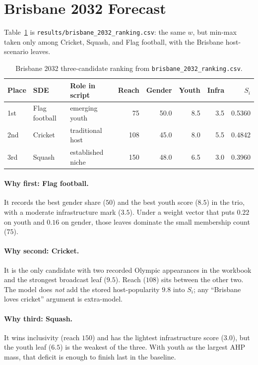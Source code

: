 \documentclass[12pt]{article}
\begin{document}
\section{Brisbane 2032 Forecast}
\label{sec:bris}

Table~\ref{tab:bris} is \texttt{results/brisbane\_2032\_ranking.csv}: the same
\(w\), but min-max taken only among Cricket, Squash, and Flag football, with the
Brisbane host-scenario leaves.

\begin{table}[htbp]
\centering
\caption{Brisbane 2032 three-candidate ranking from \texttt{brisbane\_2032\_ranking.csv}.}
\label{tab:bris}
\begin{tabular}{ll l rrrrr}
\toprule
Place & SDE & Role in script & Reach & Gender & Youth & Infra & \(S_i\) \\
\midrule
1st & Flag football & emerging youth & 75 & 50.0 & 8.5 & 3.5 & 0.5360 \\
2nd & Cricket & traditional host & 108 & 45.0 & 8.0 & 5.5 & 0.4842 \\
3rd & Squash & established niche & 150 & 48.0 & 6.5 & 3.0 & 0.3960 \\
\bottomrule
\end{tabular}
\end{table}

\paragraph{Why first: Flag football.}
It records the best gender share (\(50\)) and the best youth score (\(8.5\)) in the
trio, with a moderate infrastructure mark (\(3.5\)). Under a weight vector that
puts \(0.22\) on youth and \(0.16\) on gender, those leaves dominate the small
membership count (\(75\)).

\paragraph{Why second: Cricket.}
It is the only candidate with two recorded Olympic appearances in the workbook and
the strongest broadcast leaf (\(9.5\)). Reach (\(108\)) sits between the other two.
The model does \emph{not} add the stored host-popularity \(9.8\) into \(S_i\); any
``Brisbane loves cricket'' argument is extra-model.

\paragraph{Why third: Squash.}
It wins inclusivity (reach \(150\)) and has the lightest infrastructure score
(\(3.0\)), but the youth leaf (\(6.5\)) is the weakest of the three. With youth as
the largest AHP mass, that deficit is enough to finish last in the baseline.
\end{document}
